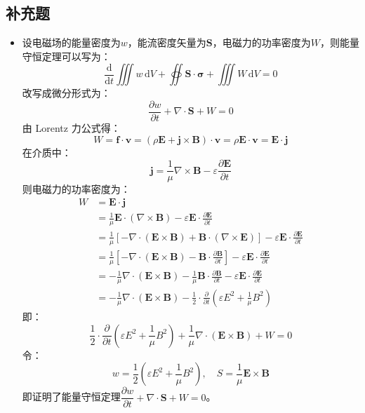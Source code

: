 \documentclass[a4paper,fontset=none]{ctexart}
\begin{document}
    \subsection*{补充题}

    \begin{itemize}

        \item[3.]
        设电磁场的能量密度为$w$，能流密度矢量为$\bm{S}$，电磁力的功率密度为$W$，则能量守恒定理可以写为：
        \[
            \frac{\mathrm{d}}{\mathrm{d}t}\iiint w\,\mathrm{d}V + \oiint \bm{S}\cdot\bm{\sigma} + \iiint W\,\mathrm{d}V = 0
        \]
        改写成微分形式为：
        \[
            \frac{\partial w}{\partial t} + \nabla\cdot\bm{S} + W = 0
        \]
        由 Lorentz 力公式得：
        \[
            W = \bm{f}\cdot\bm{v} = (\rho\bm{E}+\bm{j}\times\bm{B})\cdot\bm{v} = \rho\bm{E}\cdot\bm{v} = \bm{E}\cdot\bm{j}
        \]
        在介质中：
        \[
            \bm{j} = \frac{1}{\mu}\nabla\times\bm{B} - \varepsilon\frac{\partial\bm{E}}{\partial t}
        \]
        则电磁力的功率密度为：
        \begin{align*}
            W
            &= \bm{E}\cdot\bm{j} \\
            &= \frac{1}{\mu}\bm{E}\cdot(\nabla\times\bm{B}) - \varepsilon\bm{E}\cdot\frac{\partial\bm{E}}{\partial t} \\
            &= \frac{1}{\mu}[-\nabla\cdot(\bm{E}\times\bm{B}) + \bm{B}\cdot(\nabla\times\bm{E})] - \varepsilon\bm{E}\cdot\frac{\partial\bm{E}}{\partial t} \\
            &= \frac{1}{\mu}[-\nabla\cdot(\bm{E}\times\bm{B}) - \bm{B}\cdot\frac{\partial\bm{B}}{\partial t}] - \varepsilon\bm{E}\cdot\frac{\partial\bm{E}}{\partial t} \\
            &= -\frac{1}{\mu}\nabla\cdot(\bm{E}\times\bm{B}) - \frac{1}{\mu}\bm{B}\cdot\frac{\partial\bm{B}}{\partial t} - \varepsilon\bm{E}\cdot\frac{\partial\bm{E}}{\partial t} \\
            &= -\frac{1}{\mu}\nabla\cdot(\bm{E}\times\bm{B}) - \frac{1}{2}\cdot\frac{\partial}{\partial t}\left(\varepsilon E^2+\frac{1}{\mu}B^2\right)
        \end{align*}
        即：
        \[
            \frac{1}{2}\cdot\frac{\partial}{\partial t}\left(\varepsilon E^2+\frac{1}{\mu}B^2\right) + \frac{1}{\mu}\nabla\cdot(\bm{E}\times\bm{B}) + W = 0
        \]
        令：
        \[
            w = \frac{1}{2}\left(\varepsilon E^2+\frac{1}{\mu}B^2\right),\quad S = \frac{1}{\mu}\bm{E}\times\bm{B}
        \]
        即证明了能量守恒定理$\dfrac{\partial w}{\partial t} + \nabla\cdot\bm{S} + W = 0$。


\end{itemize}
\end{document}
